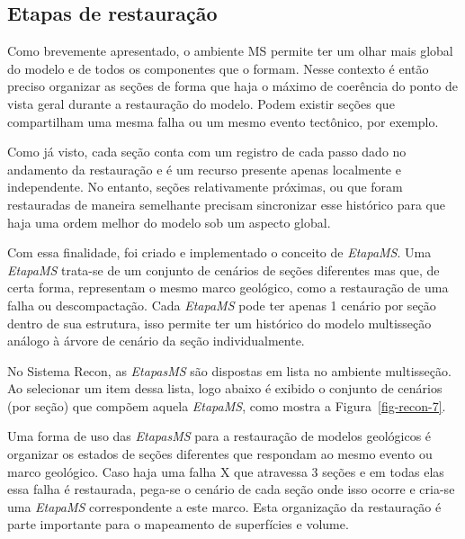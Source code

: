 \subsection{Etapas de restauração}

Como brevemente apresentado, o ambiente MS permite ter um olhar mais global do modelo e de todos os componentes que o formam. Nesse contexto é então preciso organizar as seções de forma que haja o máximo de coerência do ponto de vista geral durante a restauração do modelo. Podem existir seções que compartilham uma mesma falha ou um mesmo evento tectônico, por exemplo.

Como já visto, cada seção conta com um registro de cada passo dado no andamento da restauração e é um recurso presente apenas localmente e independente. No entanto, seções relativamente próximas, ou que foram restauradas de maneira semelhante precisam sincronizar esse histórico para que haja uma ordem melhor do modelo sob um aspecto global.

Com essa finalidade, foi criado e implementado o conceito de \textit{EtapaMS}. Uma \textit{EtapaMS} trata-se de um conjunto de cenários de seções diferentes mas que, de certa forma, representam o mesmo marco geológico, como a restauração de uma falha ou descompactação. Cada \textit{EtapaMS} pode ter apenas 1 cenário por seção dentro de sua estrutura, isso permite ter um histórico do modelo multisseção análogo à árvore de cenário da seção individualmente.

No Sistema Recon, as \textit{EtapasMS} são dispostas em lista no ambiente multisseção. Ao selecionar um item dessa lista, logo abaixo é exibido o conjunto de cenários (por seção) que compõem aquela \textit{EtapaMS}, como mostra a Figura~\ref{fig-recon-7}.

Uma forma de uso das \textit{EtapasMS} para a restauração de modelos geológicos é organizar os estados de seções diferentes que respondam ao mesmo evento ou marco geológico. Caso haja uma falha X que atravessa 3 seções e em todas elas essa falha é restaurada, pega-se o cenário de cada seção onde isso ocorre e cria-se uma \textit{EtapaMS} correspondente a este marco. Esta organização da restauração é parte importante para o mapeamento de superfícies e volume.


